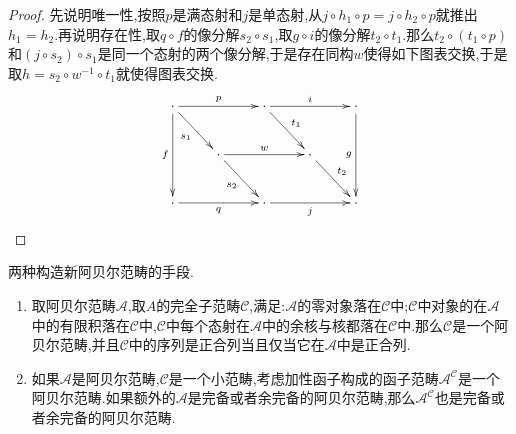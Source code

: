 \begin{enumerate}
\begin{proof}
		先说明唯一性,按照$p$是满态射和$j$是单态射,从$j\circ h_1\circ p=j\circ h_2\circ p$就推出$h_1=h_2$.再说明存在性,取$q\circ f$的像分解$s_2\circ s_1$,取$g\circ i$的像分解$t_2\circ t_1$.那么$t_2\circ(t_1\circ p)$和$(j\circ s_2)\circ s_1$是同一个态射的两个像分解,于是存在同构$w$使得如下图表交换,于是取$h=s_2\circ w^{-1}\circ t_1$就使得图表交换.
		$$\xymatrix{\cdot\ar[rr]^p\ar[dd]_f\ar[dr]_{s_1}&&\cdot\ar[rr]^i\ar[dr]^{t_1}&&\cdot\ar[dd]_g\\&\cdot\ar[dr]_{s_2}\ar[rr]^w&&\cdot\ar[dr]^{t_2}&\\\cdot\ar[rr]_q&&\cdot\ar[rr]_j&&\cdot}$$
	\end{proof}
\end{enumerate}

两种构造新阿贝尔范畴的手段.
\begin{enumerate}
	\item 取阿贝尔范畴$\mathscr{A}$,取$A$的完全子范畴$\mathscr{C}$,满足:$\mathscr{A}$的零对象落在$\mathscr{C}$中;$\mathscr{C}$中对象的在$\mathscr{A}$中的有限积落在$\mathscr{C}$中,$\mathscr{C}$中每个态射在$\mathscr{A}$中的余核与核都落在$\mathscr{C}$中.那么$\mathscr{C}$是一个阿贝尔范畴,并且$\mathscr{C}$中的序列是正合列当且仅当它在$\mathscr{A}$中是正合列.
	\item 如果$\mathscr{A}$是阿贝尔范畴,$\mathscr{C}$是一个小范畴,考虑加性函子构成的函子范畴$\mathscr{A}^{\mathscr{C}}$是一个阿贝尔范畴.如果额外的$\mathscr{A}$是完备或者余完备的阿贝尔范畴,那么$\mathscr{A}^{\mathscr{C}}$也是完备或者余完备的阿贝尔范畴.
\end{enumerate}

